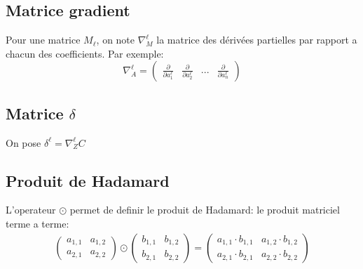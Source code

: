 \documentclass[10pt,a4paper,titlepage]{article}
\begin{document}
\subsection{Matrice gradient}
Pour une matrice $M_{\ell}$, on note $\nabla_M^{\ell}$ la matrice des dérivées partielles par rapport a chacun des coefficients.
Par exemple: 
\[\nabla_A^{\ell} = \begin{pmatrix} \frac{\partial}{\partial a_1^\ell} & \frac{\partial}{\partial a_2^\ell} & ... & \frac{\partial}{\partial a_n^\ell} \end{pmatrix}\]

\subsection{Matrice $\delta$}
On pose $\delta^{\ell} = \nabla_Z^{\ell}C$

\subsection{Produit de Hadamard}
L'operateur $\odot$ permet de definir le produit de Hadamard: le produit matriciel terme a terme:
\begin{align*}
\begin{pmatrix} a_{1,1} & a_{1,2} \\
a_{2,1} & a_{2,2}
\end{pmatrix}
\odot
\begin{pmatrix} b_{1,1} & b_{1,2} \\
b_{2,1} & b_{2,2}
\end{pmatrix}=
\begin{pmatrix} a_{1,1} \cdot b_{1,1} & a_{1,2} \cdot b_{1,2} \\
a_{2,1} \cdot b_{2,1} & a_{2,2} \cdot b_{2,2}
\end{pmatrix}
\end{align*}
\end{document}
